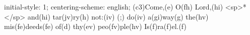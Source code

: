 initial-style: 1;
centering-scheme: english;
(c3)Come,(e) O(fh) Lord,(hi) <sp>*</sp> and(hi) tar(jv)ry(h) not:(iv) (;) do(iv) a(gi)way(g) the(hv) mis(fe)deeds(fe) of(d) thy(ev) peo(fv)ple(hv) Is(f)ra(f)el.(f)
